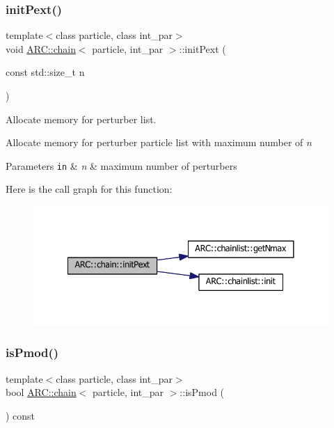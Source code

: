 \subsubsection{\texorpdfstring{init\+Pext()}{initPext()}}
{\footnotesize\ttfamily template$<$class particle, class int\+\_\+par$>$ \\
void \hyperlink{classARC_1_1chain}{A\+R\+C\+::chain}$<$ particle, int\+\_\+par $>$\+::init\+Pext (\begin{DoxyParamCaption}\item[{const std\+::size\+\_\+t}]{n }\end{DoxyParamCaption})\hspace{0.3cm}{\ttfamily [inline]}}



Allocate memory for perturber list. 

Allocate memory for perturber particle list with maximum number of {\itshape n} 
\begin{DoxyParams}[1]{Parameters}
\mbox{\tt in}  & {\em n} & maximum number of perturbers \\
\hline
\end{DoxyParams}
Here is the call graph for this function\+:
\nopagebreak
\begin{figure}[H]
\begin{center}
\leavevmode
\includegraphics[width=341pt]{classARC_1_1chain_a1c6de84a911feff1425dfb59e7a89087_cgraph}
\end{center}
\end{figure}
\hypertarget{classARC_1_1chain_a29ff9707fe94a554966c885d9bafa819}{}\label{classARC_1_1chain_a29ff9707fe94a554966c885d9bafa819} 
\subsubsection{\texorpdfstring{is\+Pmod()}{isPmod()}}
{\footnotesize\ttfamily template$<$class particle, class int\+\_\+par$>$ \\
bool \hyperlink{classARC_1_1chain}{A\+R\+C\+::chain}$<$ particle, int\+\_\+par $>$\+::is\+Pmod (\begin{DoxyParamCaption}{ }\end{DoxyParamCaption}) const\hspace{0.3cm}{\ttfamily [inline]}}



